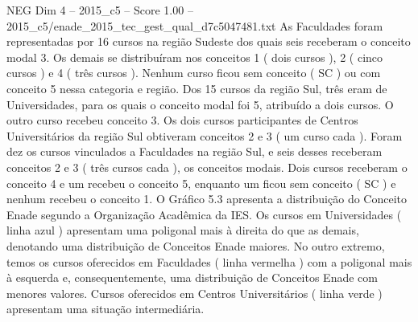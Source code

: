 \begin{textsample}{NEG Dim 4 – 2015\_c5 – Score 1.00 – 2015\_c5/enade\_2015\_tec\_gest\_qual\_d7c5047481.txt}
As Faculdades foram representadas por 16 cursos na região Sudeste dos quais seis receberam o conceito modal 3.
Os demais se distribuíram nos conceitos 1 ( dois cursos ), 2 ( cinco cursos ) e 4 ( três cursos ).
Nenhum curso ficou sem conceito ( SC ) ou com conceito 5 nessa categoria e região.
Dos 15 cursos da região Sul, três eram de Universidades, para os quais o conceito modal foi 5, atribuído a dois cursos.
O outro curso recebeu conceito 3.
Os dois cursos participantes de Centros Universitários da região Sul obtiveram conceitos 2 e 3 ( um curso cada ).
Foram dez os cursos vinculados a Faculdades na região Sul, e seis desses receberam conceitos 2 e 3 ( três cursos cada ), os conceitos modais.
Dois cursos receberam o conceito 4 e um recebeu o conceito 5, enquanto um ficou sem conceito ( SC ) e nenhum recebeu o conceito 1.
O Gráfico 5.3 apresenta a distribuição do Conceito Enade segundo a Organização Acadêmica da IES.
Os cursos em Universidades ( linha azul ) apresentam uma poligonal mais à direita do que as demais, denotando uma distribuição de Conceitos Enade maiores.
No outro extremo, temos os cursos oferecidos em Faculdades ( linha vermelha ) com a poligonal mais à esquerda e, consequentemente, uma distribuição de Conceitos Enade com menores valores.
Cursos oferecidos em Centros Universitários ( linha verde ) apresentam uma situação intermediária.

\end{textsample}
